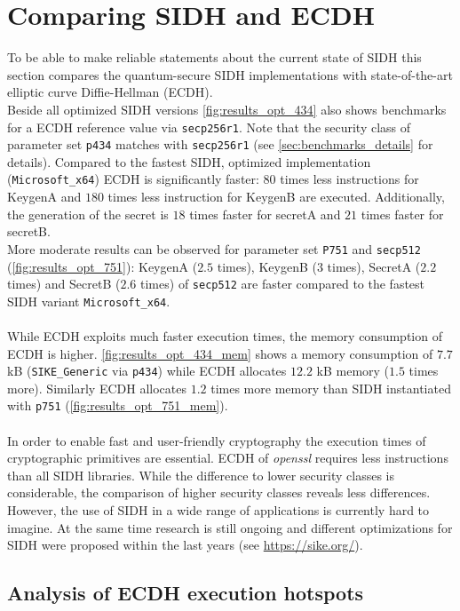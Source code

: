 \section{Comparing SIDH and ECDH} \label{sec:analysis_effiency_ecdh}

To be able to make reliable statements about the current state of SIDH this section compares the quantum-secure SIDH implementations with state-of-the-art elliptic curve Diffie-Hellman (ECDH). \\
Beside all optimized SIDH versions \autoref{fig:results_opt_434} also shows benchmarks for a ECDH reference value via \texttt{secp256r1}. Note that the security class of parameter set \texttt{p434} matches with \texttt{secp256r1} (see \autoref{sec:benchmarks_details} for details). Compared to the fastest SIDH, optimized implementation (\texttt{Microsoft\_x64}) ECDH is significantly faster: $80$ times less instructions for KeygenA and $180$ times less instruction for KeygenB are executed. Additionally, the generation of the secret is $18$ times faster for secretA and $21$ times faster for secretB.\\
More moderate results can be observed for parameter set \texttt{P751} and \texttt{secp512} (\autoref{fig:results_opt_751}): KeygenA ($2.5$ times),  KeygenB ($3$ times), SecretA ($2.2$ times) and SecretB ($2.6$ times) of \texttt{secp512} are faster compared to the fastest SIDH variant \texttt{Microsoft\_x64}.
\\\\
While ECDH exploits much faster execution times, the memory consumption of ECDH is higher.  \autoref{fig:results_opt_434_mem} shows a memory consumption of $7.7$ kB (\texttt{SIKE\_Generic} via \texttt{p434}) while ECDH allocates $12.2$ kB memory ($1.5$ times more). Similarly ECDH allocates $1.2$ times more memory than SIDH instantiated with \texttt{p751} (\autoref{fig:results_opt_751_mem}).
\\\\
In order to enable fast and user-friendly cryptography the execution times of cryptographic primitives are essential. ECDH of \textit{openssl} requires less instructions than all SIDH libraries. While the difference to lower security classes is considerable, the comparison of higher security classes reveals less differences. However, the use of SIDH in a wide range of applications is currently hard to imagine. At the same time research is still ongoing and different optimizations for SIDH were proposed within the last years (see \url{https://sike.org/}). 
\subsection{Analysis of ECDH execution hotspots}

